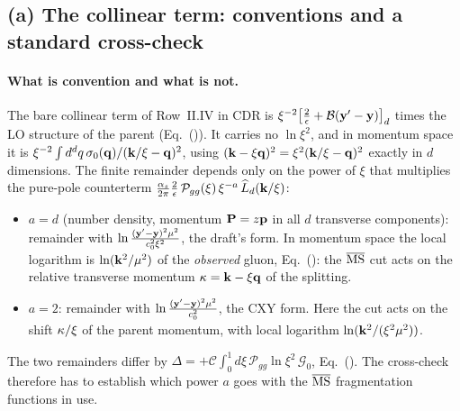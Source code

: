 \subsection{(a) The collinear term: conventions and a standard cross-check}\label{sec:c-a}

\paragraph{What is convention and what is not.} The bare collinear term of Row~II.IV in CDR is $\xi^{-2}\big[\frac2\epsilon+\mathcal B(\mathbf{y}'-\mathbf{y})\big]_d$ times the LO structure of the parent (Eq.~()). It carries no $\ln\xi^2$, and in momentum space it is $\xi^{-2}\int d^dq\,\sigma_0(\mathbf{q})/(\mathbf{k}/\xi-\mathbf{q})^2$, using $(\mathbf{k}-\xi\mathbf{q})^2=\xi^2(\mathbf{k}/\xi-\mathbf{q})^2$ exactly in $d$ dimensions. The finite remainder depends only on the power of $\xi$ that multiplies the pure-pole counterterm $\frac{\alpha_s}{2\pi}\frac2\epsilon\,\mathcal P_{gg}(\xi)\,\xi^{-a}\,\widehat L_d(\mathbf{k}/\xi)$:
\begin{itemize}
\item $a=d$ (number density, momentum $\mathbf{P}=z\mathbf{p}$ in all $d$ transverse components): remainder with $\ln\frac{(\mathbf{y}'-\mathbf{y})^2\mu^2}{c_0^2\xi^2}$, the draft's form. In momentum space the local logarithm is $\ln(\mathbf{k}^2/\mu^2)$ of the \emph{observed} gluon, Eq.~(): the $\overline{\rm MS}$ cut acts on the relative transverse momentum $\mathbf{\kappa}=\mathbf{k}-\xi\mathbf{q}$ of the splitting.
\item $a=2$: remainder with $\ln\frac{(\mathbf{y}'-\mathbf{y})^2\mu^2}{c_0^2}$, the CXY form. Here the cut acts on the shift $\mathbf{\kappa}/\xi$ of the parent momentum, with local logarithm $\ln(\mathbf{k}^2/(\xi^2\mu^2))$.
\end{itemize}
The two remainders differ by $\Delta=+\mathcal C\int_0^1d\xi\,\mathcal P_{gg}\ln\xi^2\,\mathcal G_0$, Eq.~(). The cross-check therefore has to establish which power $a$ goes with the $\overline{\rm MS}$ fragmentation functions in use.

